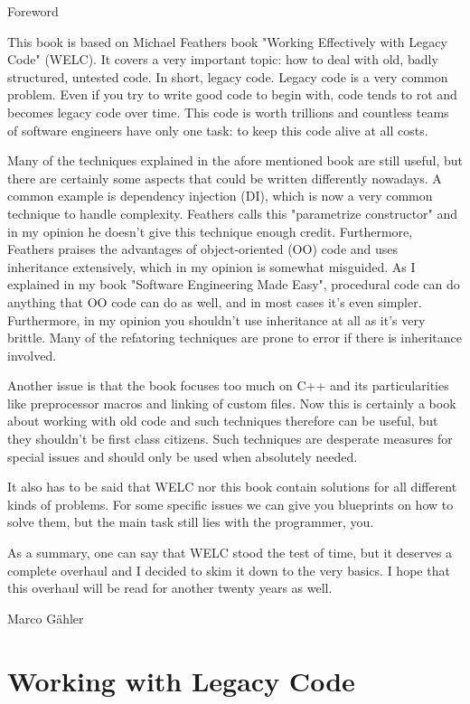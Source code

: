 
Foreword

This book is based on Michael Feathers book "Working Effectively with Legacy Code" (WELC). It covers a very important topic: how to deal with old, badly structured, untested code. In short, legacy code. Legacy code is a very common problem. Even if you try to write good code to begin with, code tends to rot and becomes legacy code over time. This code is worth trillions and countless teams of software engineers have only one task: to keep this code alive at all costs.

Many of the techniques explained in the afore mentioned book are still useful, but there are certainly some aspects that could be written differently nowadays. A common example is dependency injection (DI), which is now a very common technique to handle complexity. Feathers calls this "parametrize constructor" and in my opinion he doesn't give this technique enough credit. Furthermore, Feathers praises the advantages of object-oriented (OO) code and uses inheritance extensively, which in my opinion is somewhat misguided. As I explained in my book "Software Engineering Made Easy", procedural code can do anything that OO code can do as well, and in most cases it's even simpler. Furthermore, in my opinion you shouldn't use inheritance at all as it's very brittle. Many of the refatoring techniques are prone to error if there is inheritance involved.

Another issue is that the book focuses too much on C++ and its particularities like preprocessor macros and linking of custom files. Now this is certainly a book about working with old code and such techniques therefore can be useful, but they shouldn't be first class citizens. Such techniques are desperate measures for special issues and should only be used when absolutely needed.

It also has to be said that WELC nor this book contain solutions for all different kinds of problems. For some specific issues we can give you blueprints on how to solve them, but the main task still lies with the programmer, you.  

As a summary, one can say that WELC stood the test of time, but it deserves a complete overhaul and I decided to skim it down to the very basics. I hope that this overhaul will be read for another twenty years as well.

Marco Gähler

\chapter{Working with Legacy Code}


